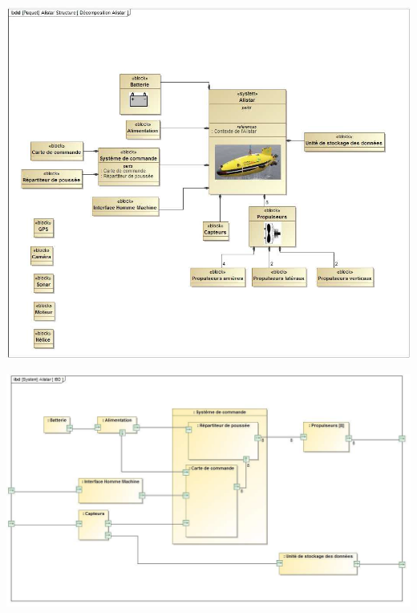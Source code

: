 \documentclass[11pt,oneside]{article}
\begin{document}
{\begin{center}
\includegraphics[width=.95\textwidth]{png/fig_13}
\end{center}

\begin{center}
\includegraphics[width=.95\textwidth]{png/fig_14}
\end{center}

}
\end{document}
